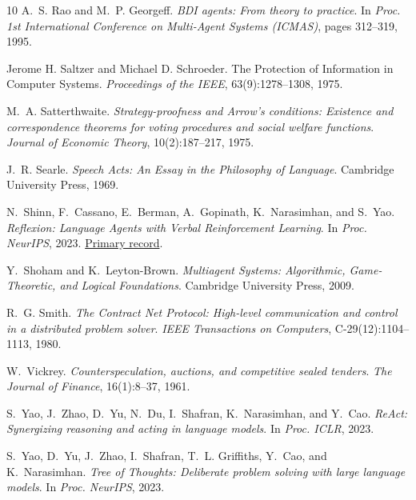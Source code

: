 \documentclass[11pt,a4paper]{article}
\begin{document}
\begin{thebibliography}{10}
A.~S. Rao and M.~P. Georgeff.
\newblock \emph{BDI agents: From theory to practice}.
\newblock In \emph{Proc. 1st International Conference on Multi-Agent Systems (ICMAS)}, pages 312--319, 1995.

Jerome H. Saltzer and Michael D. Schroeder.
\newblock The Protection of Information in Computer Systems.
\newblock \textit{Proceedings of the IEEE}, 63(9):1278--1308, 1975.

M.~A. Satterthwaite.
\newblock \emph{Strategy-proofness and Arrow's conditions: Existence and correspondence theorems for voting procedures and social welfare functions}.
\newblock \emph{Journal of Economic Theory}, 10(2):187--217, 1975.

J.~R. Searle.
\newblock \emph{Speech Acts: An Essay in the Philosophy of Language}.
\newblock Cambridge University Press, 1969.

N.~Shinn, F.~Cassano, E.~Berman, A.~Gopinath, K.~Narasimhan, and S.~Yao.
\newblock \emph{Reflexion: Language Agents with Verbal Reinforcement Learning}.
\newblock In \emph{Proc. NeurIPS}, 2023.
\newblock \href{https://arxiv.org/abs/2303.11366v4}{Primary record}.

Y.~Shoham and K.~Leyton-Brown.
\newblock \emph{Multiagent Systems: Algorithmic, Game-Theoretic, and Logical Foundations}.
\newblock Cambridge University Press, 2009.

R.~G. Smith.
\newblock \emph{The Contract Net Protocol: High-level communication and control in a distributed problem solver}.
\newblock \emph{IEEE Transactions on Computers}, C-29(12):1104--1113, 1980.

W.~Vickrey.
\newblock \emph{Counterspeculation, auctions, and competitive sealed tenders}.
\newblock \emph{The Journal of Finance}, 16(1):8--37, 1961.

S.~Yao, J.~Zhao, D.~Yu, N.~Du, I.~Shafran, K.~Narasimhan, and Y.~Cao.
\newblock \emph{ReAct: Synergizing reasoning and acting in language models}.
\newblock In \emph{Proc. ICLR}, 2023.

S.~Yao, D.~Yu, J.~Zhao, I.~Shafran, T.~L. Griffiths, Y.~Cao, and K.~Narasimhan.
\newblock \emph{Tree of Thoughts: Deliberate problem solving with large language models}.
\newblock In \emph{Proc. NeurIPS}, 2023.



\end{thebibliography}
\end{document}
